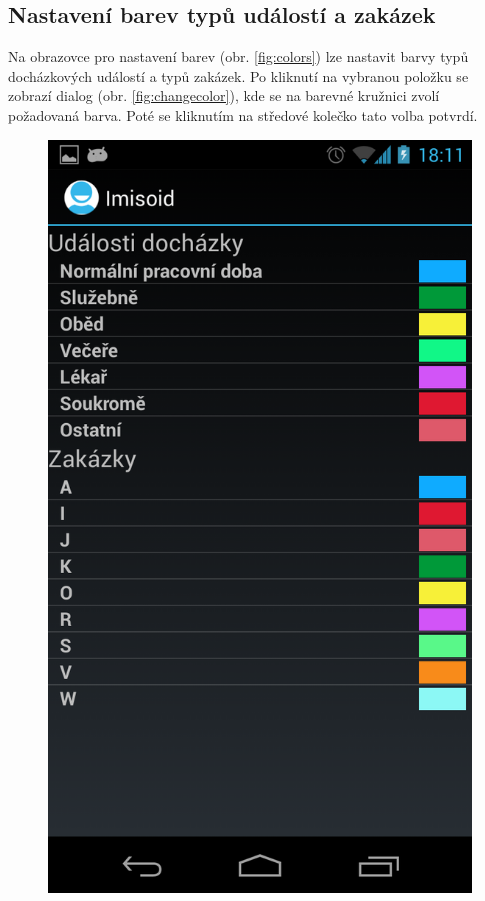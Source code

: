 \documentclass{diplomka}
\begin{document}
\newpage
\subsection{Nastavení barev typů událostí a zakázek}
\label{sec:colors}
Na obrazovce pro nastavení barev (obr. \ref{fig:colors}) lze nastavit barvy typů docházkových událostí a typů zakázek. Po kliknutí na vybranou položku se zobrazí dialog (obr. \ref{fig:changecolor}), kde se na barevné kružnici zvolí požadovaná barva. Poté se kliknutím na středové kolečko tato volba potvrdí.

\begin{figure}[H]
\centering
\begin{minipage}{.45\textwidth}
  \centering
  \includegraphics[width=.9\linewidth]{scr/colors.png}

\end{minipage}
\end{figure}
\end{document}
